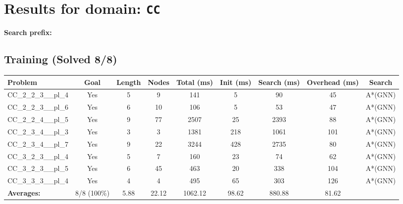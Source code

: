 \documentclass{article}
\begin{document}
\section*{Results for domain: \texttt{CC}}
\textbf{Search prefix:} 
\\[0.5cm]
\subsection*{Training (Solved 8/8)}
\begin{tabular}{lcccccccc}
\toprule
Problem & Goal & Length & Nodes & Total (ms) & Init (ms) & Search (ms) & Overhead (ms) & Search \\
\midrule
CC\_2\_2\_3\_\_pl\_4 & Yes & 5 & 9 & 141 & 5 & 90 & 45 & A*(GNN) \\
CC\_2\_2\_3\_\_pl\_6 & Yes & 6 & 10 & 106 & 5 & 53 & 47 & A*(GNN) \\
CC\_2\_2\_4\_\_pl\_5 & Yes & 9 & 77 & 2507 & 25 & 2393 & 88 & A*(GNN) \\
CC\_2\_3\_4\_\_pl\_3 & Yes & 3 & 3 & 1381 & 218 & 1061 & 101 & A*(GNN) \\
CC\_2\_3\_4\_\_pl\_7 & Yes & 9 & 22 & 3244 & 428 & 2735 & 80 & A*(GNN) \\
CC\_3\_2\_3\_\_pl\_4 & Yes & 5 & 7 & 160 & 23 & 74 & 62 & A*(GNN) \\
CC\_3\_2\_3\_\_pl\_5 & Yes & 6 & 45 & 463 & 20 & 338 & 104 & A*(GNN) \\
CC\_3\_3\_3\_\_pl\_4 & Yes & 4 & 4 & 495 & 65 & 303 & 126 & A*(GNN) \\
\textbf{Averages:} & 8/8 (100\%) & 5.88 & 22.12 & 1062.12 & 98.62 & 880.88 & 81.62 & \\
\bottomrule
\end{tabular}
\\[0.7cm]
\end{document}
